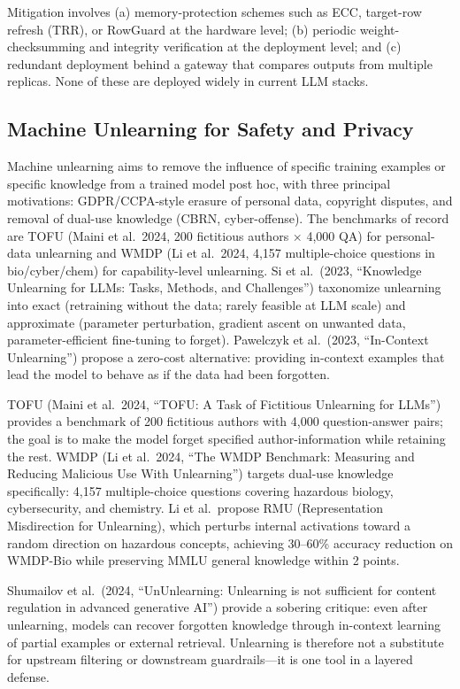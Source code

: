 Mitigation involves (a) memory-protection schemes such as ECC, target-row refresh (TRR), or RowGuard at the hardware level; (b) periodic weight-checksumming and integrity verification at the deployment level; and (c) redundant deployment behind a gateway that compares outputs from multiple replicas. None of these are deployed widely in current LLM stacks.

\subsection{Machine Unlearning for Safety and Privacy}\label{machine-unlearning-for-safety-and-privacy}

Machine unlearning aims to remove the influence of specific training examples or specific knowledge from a trained model post hoc, with three principal motivations: GDPR/CCPA-style erasure of personal data, copyright disputes, and removal of dual-use knowledge (CBRN, cyber-offense). The benchmarks of record are TOFU (Maini et al.~2024, 200 fictitious authors × 4,000 QA) for personal-data unlearning and WMDP (Li et al.~2024, 4,157 multiple-choice questions in bio/cyber/chem) for capability-level unlearning. Si et al.~(2023, ``Knowledge Unlearning for LLMs: Tasks, Methods, and Challenges'') taxonomize unlearning into exact (retraining without the data; rarely feasible at LLM scale) and approximate (parameter perturbation, gradient ascent on unwanted data, parameter-efficient fine-tuning to forget). Pawelczyk et al.~(2023, ``In-Context Unlearning'') propose a zero-cost alternative: providing in-context examples that lead the model to behave as if the data had been forgotten.

TOFU (Maini et al.~2024, ``TOFU: A Task of Fictitious Unlearning for LLMs'') provides a benchmark of 200 fictitious authors with 4,000 question-answer pairs; the goal is to make the model forget specified author-information while retaining the rest. WMDP (Li et al.~2024, ``The WMDP Benchmark: Measuring and Reducing Malicious Use With Unlearning'') targets dual-use knowledge specifically: 4,157 multiple-choice questions covering hazardous biology, cybersecurity, and chemistry. Li et al.~propose RMU (Representation Misdirection for Unlearning), which perturbs internal activations toward a random direction on hazardous concepts, achieving 30--60\% accuracy reduction on WMDP-Bio while preserving MMLU general knowledge within 2 points.

Shumailov et al.~(2024, ``UnUnlearning: Unlearning is not sufficient for content regulation in advanced generative AI'') provide a sobering critique: even after unlearning, models can recover forgotten knowledge through in-context learning of partial examples or external retrieval. Unlearning is therefore not a substitute for upstream filtering or downstream guardrails---it is one tool in a layered defense.

